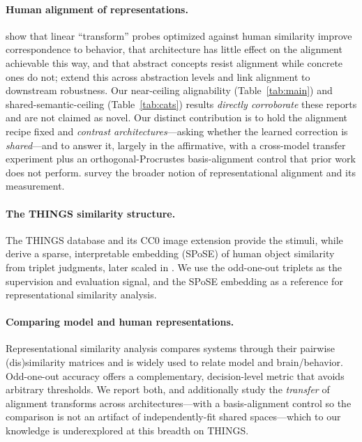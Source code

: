 \documentclass{article}
\begin{document}
\paragraph{Human alignment of representations.}
\citet{muttenthaler2023human} show that linear ``transform'' probes optimized
against human similarity improve correspondence to behavior, that architecture has
little effect on the alignment achievable this way, and that abstract concepts
resist alignment while concrete ones do not; \citet{muttenthaler2024aligning} extend
this across abstraction levels and link alignment to downstream robustness. Our
near-ceiling alignability (Table~\ref{tab:main}) and shared-semantic-ceiling
(Table~\ref{tab:cats}) results \emph{directly corroborate} these reports and are not
claimed as novel. Our distinct contribution is to hold the alignment recipe fixed
and \emph{contrast architectures}---asking whether the learned correction is
\emph{shared}---and to answer it, largely in the affirmative, with a cross-model
transfer experiment plus an orthogonal-Procrustes basis-alignment control that prior
work does not perform.
\citet{sucholutsky2023alignment} survey the broader notion of representational
alignment and its measurement.

\paragraph{The THINGS similarity structure.}
The THINGS database \citep{hebart2019things} and its CC0 image extension
\citep{stoinski2024thingsplus} provide the stimuli, while
\citet{hebart2020revealing} derive a sparse, interpretable embedding (SPoSE) of
human object similarity from triplet judgments, later scaled in
\citet{hebart2023things}. We use the odd-one-out triplets as the supervision and
evaluation signal, and the SPoSE embedding as a reference for representational
similarity analysis.

\paragraph{Comparing model and human representations.}
Representational similarity analysis \citep{kriegeskorte2008rsa} compares systems
through their pairwise (dis)similarity matrices and is widely used to relate model
and brain/behavior. Odd-one-out accuracy offers a complementary, decision-level
metric that avoids arbitrary thresholds. We report both, and additionally study
the \emph{transfer} of alignment transforms across architectures---with a
basis-alignment control so the comparison is not an artifact of independently-fit
shared spaces---which to our knowledge is underexplored at this breadth on THINGS.
\end{document}
